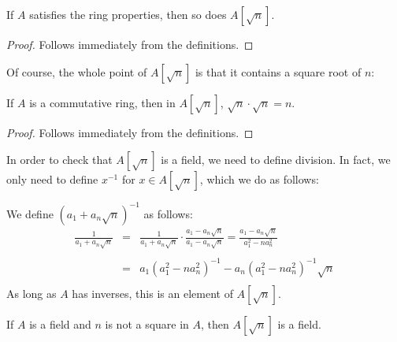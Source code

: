 
\begin{proposition}
  \label{thm:adjoinRing}
  \leanok
  If $A$ satisfies the ring properties, then so does $A[\sqrt{n}]$.
\end{proposition}

\begin{proof}
  \leanok
  Follows immediately from the definitions.
\end{proof}


Of course, the whole point of $A[\sqrt{n}]$ is that it contains a square root of $n$:
\begin{theorem}
  \label{thm:adjoinHasSqrtN}
  \leanok
  If $A$ is a commutative ring, then in $A[\sqrt{n}]$, $\sqrt{n} \cdot \sqrt{n} = n$.
\end{theorem}

\begin{proof}
  \leanok
  Follows immediately from the definitions.
\end{proof}


In order to check that $A[\sqrt{n}]$ is a field, we need to define division. In
fact, we only need to define $x^{-1}$ for $x ∈ A[\sqrt{n}]$, which we do as
follows:

\begin{definition}[Inverse]
  \label{def:adjoinInv}
  \leanok
  We define $(a_1 + a_n\sqrt{n})^{-1}$ as follows:
  \begin{eqnarray*}
    \frac{1}{a_1 + a_n\sqrt{n}}
      & = & \frac{1}{a_1 + a_n\sqrt{n}} \cdot \frac{a_1 - a_n\sqrt{n}}{a_1 - a_n\sqrt{n}}
        =   \frac{a_1 - a_n\sqrt{n}}{a_1^2 - na_n^2} \\ \\
      & = & a_1(a_1^2 - na_n^2)^{-1} - a_n(a_1^2 - na_n^2)^{-1}\sqrt{n} \\
  \end{eqnarray*}
  As long as $A$ has inverses, this is an element of $A[\sqrt{n}]$.
\end{definition}

\begin{lemma}
  \label{thm:adjoinField}
  \leanok
  If $A$ is a field and $n$ is not a square in $A$, then $A[\sqrt{n}]$ is a
  field.
\end{lemma}


